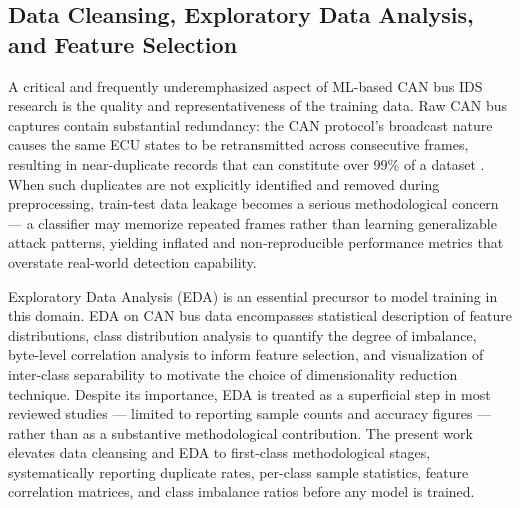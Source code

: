 \documentclass[conference]{IEEEtran}
\begin{document}
\subsection{Data Cleansing, Exploratory Data Analysis, and Feature Selection}

A critical and frequently underemphasized aspect of ML-based CAN bus IDS research is the quality and representativeness of the training data. Raw CAN bus captures contain substantial redundancy: the CAN protocol's broadcast nature causes the same ECU states to be retransmitted across consecutive frames, resulting in near-duplicate records that can constitute over 99\% of a dataset \cite{article_emre}. When such duplicates are not explicitly identified and removed during preprocessing, train-test data leakage becomes a serious methodological concern — a classifier may memorize repeated frames rather than learning generalizable attack patterns, yielding inflated and non-reproducible performance metrics that overstate real-world detection capability.

Exploratory Data Analysis (EDA) is an essential precursor to model training in this domain. EDA on CAN bus data encompasses statistical description of feature distributions, class distribution analysis to quantify the degree of imbalance, byte-level correlation analysis to inform feature selection, and visualization of inter-class separability to motivate the choice of dimensionality reduction technique. Despite its importance, EDA is treated as a superficial step in most reviewed studies — limited to reporting sample counts and accuracy figures — rather than as a substantive methodological contribution. The present work elevates data cleansing and EDA to first-class methodological stages, systematically reporting duplicate rates, per-class sample statistics, feature correlation matrices, and class imbalance ratios before any model is trained.
\end{document}
